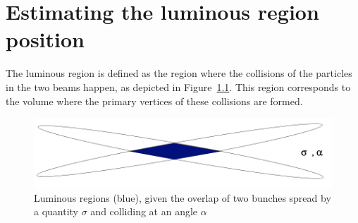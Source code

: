 \chapter{Estimating the luminous region position}\label{chap:beamline}
The luminous region is defined as the region where the collisions of the particles in the two beams happen, as depicted in Figure~\ref{fig:luminous-region}. This region corresponds to the volume where the primary vertices of these collisions are formed.



\begin{figure}
    \centering
    \includegraphics[width=\textwidth]{figures/luminous_region.png}
    \caption{Luminous regions (blue), given the overlap of two bunches spread by a quantity $\sigma$ and colliding at an angle $\alpha$}
    \label{fig:luminous-region}
\end{figure}



